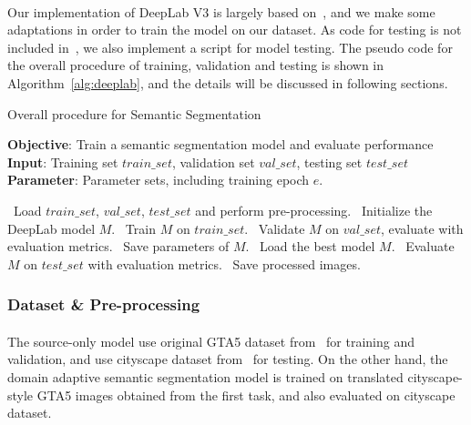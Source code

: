 \paragraph{}
Our implementation of DeepLab V3 is largely based on~\cite{Deeplab}, and we make some adaptations in order to train the model on our dataset. As code for testing is not included in~\cite{Deeplab}, we also implement a script for model testing. The pseudo code for the overall procedure of training, validation and testing is shown in Algorithm~\ref{alg:deeplab}, and the details will be discussed in following sections.
\begin{algorithm}[!ht]
    \caption{Overall procedure for Semantic Segmentation}\label{alg:deeplab}
    \textbf{Objective}: Train a semantic segmentation model and evaluate performance\\
    \textbf{Input}: Training set $train\_set$, validation set $val\_set$, testing set $test\_set$\\
    \textbf{Parameter}: Parameter sets, including training epoch $e$.
    \begin{algorithmic}[1]
        \STATE~Load $train\_set$, $val\_set$, $test\_set$ and perform pre-processing.
        \STATE~Initialize the DeepLab model $M$.
            \STATE~Train $M$ on $train\_set$.
            \STATE~Validate $M$ on $val\_set$, evaluate with evaluation metrics.
                \STATE~Save parameters of $M$. 
            \ENDIF{}
        \ENDFOR{}
        \STATE~Load the best model $M$.
        \STATE~Evaluate $M$ on $test\_set$ with evaluation metrics.
        \STATE~Save processed images.
    \end{algorithmic}
\end{algorithm}
\subsubsection{Dataset \& Pre-processing}
\paragraph{}
The source-only model use original GTA5 dataset from~\cite{richter2016playing} for training and validation, and use cityscape dataset from~\cite{cordts2016cityscapes} for testing. On the other hand, the domain adaptive semantic segmentation model is trained on translated cityscape-style GTA5 images obtained from the first task, and also evaluated on cityscape dataset.

